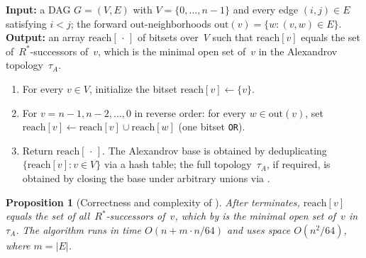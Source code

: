 \documentclass[11pt,a4paper]{article}
\theoremstyle{plain}
\newtheorem{proposition}[theorem]{Proposition}
\theoremstyle{definition}
\begin{document}
\begin{algorithm}
\caption{Alexandrov topology by reverse-order bitset propagation}%
\label{alg:alexandrov}
\textbf{Input:} a DAG $G = (V, E)$ with $V = \{0, \ldots, n-1\}$ and every
edge $(i, j) \in E$ satisfying $i < j$; the forward out-neighborhoods
$\mathrm{out}(v) = \{w : (v, w) \in E\}$. \\
\textbf{Output:} an array $\mathrm{reach}[\,\cdot\,]$ of bitsets over~$V$
such that $\mathrm{reach}[v]$ equals the set of~$R^{*}$-successors of~$v$,
which is the minimal open set of~$v$ in the Alexandrov topology~$\tau_A$.
\begin{enumerate}[leftmargin=2em, label=\textup{(\arabic*)}]
  \item For every $v \in V$, initialize the bitset $\mathrm{reach}[v]
        \leftarrow \{v\}$.
  \item For $v = n-1, n-2, \ldots, 0$ in reverse order: for every
        $w \in \mathrm{out}(v)$, set $\mathrm{reach}[v] \leftarrow
        \mathrm{reach}[v] \cup \mathrm{reach}[w]$ (one bitset \texttt{OR}).
  \item Return $\mathrm{reach}[\,\cdot\,]$.  The Alexandrov base is obtained
        by deduplicating $\{\mathrm{reach}[v] : v \in V\}$ via a hash table;
        the full topology~$\tau_A$, if required, is obtained by closing the
        base under arbitrary unions via .
\end{enumerate}
\end{algorithm}

\begin{proposition}[Correctness and complexity of ]%
\label{prop:alexandrov-correct}
After  terminates, $\mathrm{reach}[v]$ equals the set
of all~$R^{*}$-successors of~$v$, which by  is the
minimal open set of~$v$ in~$\tau_A$.  The algorithm runs in time
$O(n + m \cdot n / 64)$ and uses space $O(n^{2} / 64)$, where
$m = |E|$.
\end{proposition}
\end{document}
